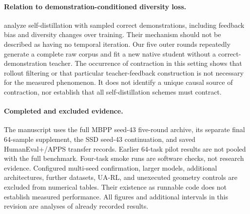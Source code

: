 \documentclass{article}
\begin{document}
\paragraph{Relation to demonstration-conditioned diversity loss.}
\citet{nicolicioiu2026diversity} analyze self-distillation with sampled correct demonstrations, including feedback bias and diversity changes over training. Their mechanism should not be described as having no temporal iteration. Our five outer rounds repeatedly generate a complete raw corpus and fit a new native student without a correct-demonstration teacher. The occurrence of contraction in this setting shows that rollout filtering or that particular teacher-feedback construction is not necessary for the measured phenomenon. It does not identify a unique causal source of contraction, nor establish that all self-distillation schemes must contract.

\paragraph{Completed and excluded evidence.}
The manuscript uses the full MBPP seed-43 five-round archive, its separate final 64-sample supplement, the SSD seed-43 continuation, and saved HumanEval+/APPS transfer records. Earlier 64-task pilot results are not pooled with the full benchmark. Four-task smoke runs are software checks, not research evidence. Configured multi-seed confirmation, larger models, additional architectures, further datasets, UA-RL, and unexecuted geometry controls are excluded from numerical tables. Their existence as runnable code does not establish measured performance. All figures and additional intervals in this revision are analyses of already recorded results.
\end{document}
